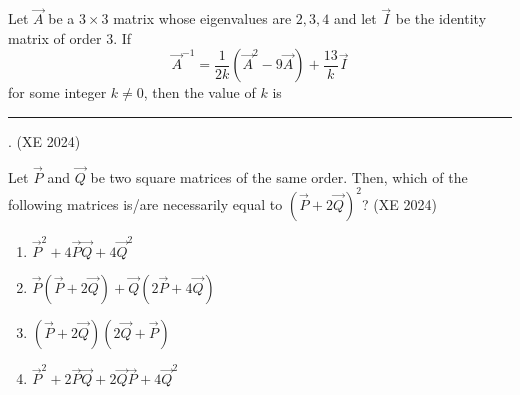 \item Let $\vec{A}$ be a $3 \times 3$ matrix whose eigenvalues are $2, 3, 4$ and let $\vec{I}$ be the identity matrix of order $3$. If  
$$
\vec{A}^{-1} = \frac{1}{2k} (\vec{A}^2 - 9\vec{A}) + \frac{13}{k} \vec{I}
$$
for some integer $k \neq 0$, then the value of $k$ is \rule{1cm}{0.01pt}.  
\hfill (XE 2024)
\item Let $\vec{P}$ and $\vec{Q}$ be two square matrices of the same order. Then, which of the
following matrices is/are necessarily equal to $(\vec{P}+2\vec{Q})^2$?
\hfill (XE 2024)
\begin{multicols}{2}
\begin{enumerate}
\item $\vec{P}^{2}+4\vec{P}\vec{Q}+4\vec{Q}^{2}$
\item $\vec{P}(\vec{P}+2\vec{Q})+\vec{Q}(2\vec{P}+4\vec{Q})$
\item $(\vec{P}+2\vec{Q})(2\vec{Q}+\vec{P})$
\item $\vec{P}^{2}+2\vec{P}\vec{Q}+2\vec{Q}\vec{P}+4\vec{Q}^{2}$
\end{enumerate}
\end{multicols}

